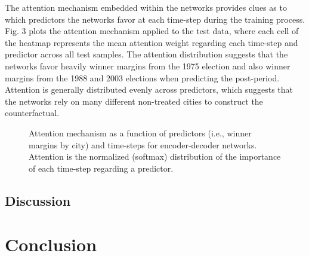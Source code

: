 \documentclass[hidelinks,12pt]{article}
\begin{document}
The attention mechanism embedded within the networks provides clues as to which predictors the networks favor at each time-step during the training process. Fig. 3 plots the attention mechanism applied to the test data, where each cell of the heatmap represents the mean attention weight regarding each time-step and predictor across all test samples. The attention distribution suggests that the networks favor heavily winner margins from the 1975 election and also winner margins from the 1988 and 2003 elections when predicting the post-period. Attention is generally distributed evenly across predictors, which suggests that the networks rely on many different non-treated cities to construct the counterfactual.

\begin{figure}[htbp]
	\centering
	\caption{Attention mechanism as a function of predictors (i.e., winner margins by city) and time-steps for encoder-decoder
		networks. Attention is the normalized (softmax) distribution of the importance of each time-step regarding a predictor.\label{attn-plot}} 
\end{figure}

\subsection{Discussion}





\section{Conclusion} \label{conclusion}
\end{document}
